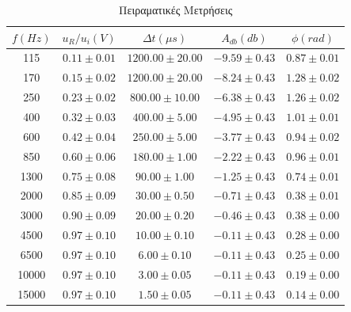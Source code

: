\documentclass[a4paper]{article}
\begin{document}
		\begin{table}
			\centering
			\begin{tabular}{c|c|c||c|c|}
			$f(Hz)$ & $u_R/u_i(V)$ & $\Delta t(\mu s)$ & $A_{db}(db)$ & $\phi(rad)$ \\
			\hline\hline
			115 & $0.11 \pm 0.01$ & $1200.00 \pm 20.00$ & $-9.59 \pm 0.43$ & $0.87 \pm 0.01$\\
170 & $0.15 \pm 0.02$ & $1200.00 \pm 20.00$ & $-8.24 \pm 0.43$ & $1.28 \pm 0.02$\\
250 & $0.23 \pm 0.02$ & $800.00 \pm 10.00$ & $-6.38 \pm 0.43$ & $1.26 \pm 0.02$\\
400 & $0.32 \pm 0.03$ & $400.00 \pm 5.00$ & $-4.95 \pm 0.43$ & $1.01 \pm 0.01$\\
600 & $0.42 \pm 0.04$ & $250.00 \pm 5.00$ & $-3.77 \pm 0.43$ & $0.94 \pm 0.02$\\
850 & $0.60 \pm 0.06$ & $180.00 \pm 1.00$ & $-2.22 \pm 0.43$ & $0.96 \pm 0.01$\\
1300 & $0.75 \pm 0.08$ & $90.00 \pm 1.00$ & $-1.25 \pm 0.43$ & $0.74 \pm 0.01$\\
2000 & $0.85 \pm 0.09$ & $30.00 \pm 0.50$ & $-0.71 \pm 0.43$ & $0.38 \pm 0.01$\\
3000 & $0.90 \pm 0.09$ & $20.00 \pm 0.20$ & $-0.46 \pm 0.43$ & $0.38 \pm 0.00$\\
4500 & $0.97 \pm 0.10$ & $10.00 \pm 0.10$ & $-0.11 \pm 0.43$ & $0.28 \pm 0.00$\\
6500 & $0.97 \pm 0.10$ & $6.00 \pm 0.10$ & $-0.11 \pm 0.43$ & $0.25 \pm 0.00$\\
10000 & $0.97 \pm 0.10$ & $3.00 \pm 0.05$ & $-0.11 \pm 0.43$ & $0.19 \pm 0.00$\\
15000 & $0.97 \pm 0.10$ & $1.50 \pm 0.05$ & $-0.11 \pm 0.43$ & $0.14 \pm 0.00$
			\end{tabular}
			\caption{Πειραματικές Μετρήσεις}
			\label{tab1}
		\end{table}
	\newpage
		
\end{document}
